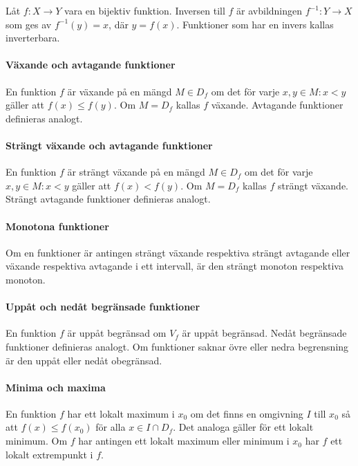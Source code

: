 Låt $f: X \to Y$ vara en bijektiv funktion. Inversen till $f$ är avbildningen $f^{-1}: Y\to X$ som ges av $f^{-1}(y)=x$, där $y=f(x)$. Funktioner som har en invers kallas inverterbara.

\paragraph{Växande och avtagande funktioner}

En funktion $f$ är växande på en mängd $M\in D_f$ om det för varje $x,y\in M: x<y$ gäller att $f(x)\leq f(y)$. Om $M=D_f$ kallas $f$ växande. Avtagande funktioner definieras analogt.

\paragraph{Strängt växande och avtagande funktioner}

En funktion $f$ är strängt växande på en mängd $M\in D_f$ om det för varje $x,y\in M: x<y$ gäller att $f(x)<f(y)$. Om $M=D_f$ kallas $f$ strängt växande. Strängt avtagande funktioner definieras analogt.

\paragraph{Monotona funktioner}

Om en funktioner är antingen strängt växande respektiva strängt avtagande eller växande respektiva avtagande i ett intervall, är den strängt monoton respektiva monoton.

\paragraph{Uppåt och nedåt begränsade funktioner}

En funktion $f$ är uppåt begränsad om $V_f$ är uppåt begränsad. Nedåt begränsade funktioner definieras analogt. Om funktioner saknar övre eller nedra begrensning är den uppåt eller nedåt obegränsad.

\paragraph{Minima och maxima}
En funktion $f$ har ett lokalt maximum i $x_0$ om det finns en omgivning $I$ till $x_0$ så att $f(x)\leq f(x_0)$ för alla $x\in I\cap D_f$. Det analoga gäller för ett lokalt minimum. Om $f$ har antingen ett lokalt maximum eller minimum i $x_0$ har $f$ ett lokalt extrempunkt i $f$.

